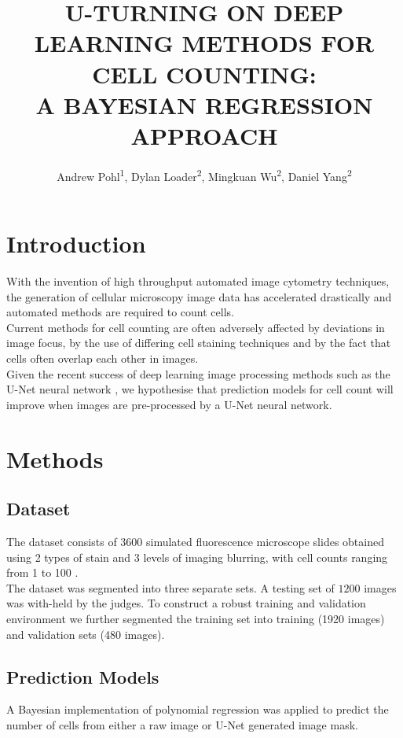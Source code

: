 \documentclass[isoft]{poster_class_UofC}
\title{\uppercase{U-turning on Deep Learning Methods for Cell Counting:\\ A Bayesian Regression Approach}}
\author{Andrew Pohl\textsuperscript{1}, Dylan Loader\textsuperscript{2}, Mingkuan Wu\textsuperscript{2}, Daniel Yang\textsuperscript{2}}
\begin{document}
    \begin{poster}
    
    \section{Introduction}
With the invention of high throughput automated image cytometry techniques, the generation of cellular microscopy image data has accelerated drastically and automated methods are required to count cells.  \\

Current methods for cell counting are often adversely affected by deviations in image focus, by the use of differing cell staining techniques and by the fact that cells often overlap each other in images. \\

Given the recent success of deep learning image processing methods such as the U-Net neural network \cite{FalkThorsten2019Udlf}, we hypothesise that prediction models for cell count will improve when images are pre-processed by a U-Net neural network.


        
    \section{Methods}%
        
        \subsection{Dataset}
The dataset consists of 3600 simulated fluorescence microscope slides obtained using 2 types of stain and 3 levels of imaging blurring, with cell counts ranging from 1 to 100 \cite{VebjornLjosa2012Ahmi}.\\

The dataset was segmented into three separate sets.  A testing set of $1200$ images was with-held by the judges.  To construct a robust training and validation environment we further segmented the training set into training (1920 images) and validation sets (480 images).

             \subsection{Prediction Models}    
A Bayesian implementation of polynomial regression was applied to predict the number of cells from either a raw image or U-Net generated image mask.  \\


\end{poster}
\end{document}

